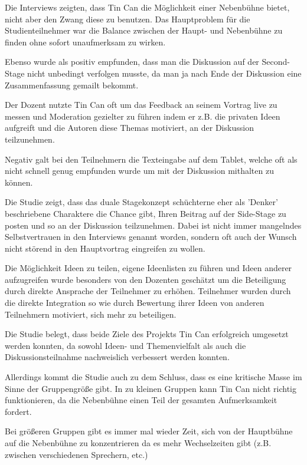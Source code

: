 Die Interviews zeigten, dass Tin Can die Möglichkeit einer Nebenbühne bietet,
nicht aber den Zwang diese zu benutzen. Das Hauptproblem für die
Studienteilnehmer war die Balance zwischen der Haupt- und Nebenbühne zu finden
ohne sofort unaufmerksam zu wirken.

Ebenso wurde als positiv empfunden, dass man die Diskussion auf der Second-Stage
nicht unbedingt verfolgen musste, da man ja nach Ende der Diskussion eine
Zusammenfassung gemailt bekommt.

Der Dozent nutzte Tin Can oft um das Feedback an seinem Vortrag live zu messen
und Moderation gezielter zu führen indem er z.B. die privaten Ideen aufgreift
und die Autoren diese Themas motiviert, an der Diskussion teilzunehmen.

Negativ galt bei den Teilnehmern die Texteingabe auf dem Tablet, welche oft als
nicht schnell genug empfunden wurde um mit der Diskussion mithalten zu können.

Die Studie\cite{HarGorSch2012} zeigt, dass das duale Stagekonzept schüchterne eher als 'Denker'
beschriebene Charaktere die Chance gibt, Ihren Beitrag auf der Side-Stage zu
posten und so an der Diskussion teilzunehmen. Dabei ist nicht immer mangelndes
Selbstvertrauen in den Interviews genannt worden, sondern oft auch der Wunsch
nicht störend in den Hauptvortrag eingreifen zu wollen.

Die Möglichkeit Ideen zu teilen, eigene Ideenlisten zu führen und Ideen anderer
aufzugreifen wurde besonders von den Dozenten geschätzt um die Beteiligung durch
direkte Ansprache der Teilnehmer zu erhöhen. Teilnehmer wurden durch die direkte
Integration so wie durch Bewertung ihrer Ideen von anderen Teilnehmern
motiviert, sich mehr zu beteiligen.

Die Studie\cite{HarGorSch2012} belegt, dass beide Ziele des Projekts Tin Can erfolgreich umgesetzt
werden konnten, da sowohl Ideen- und Themenvielfalt als auch die
Diskussionsteilnahme nachweislich verbessert werden konnten.

Allerdings kommt die Studie\cite{HarGorSch2012} auch zu dem Schluss, dass es eine kritische Masse im
Sinne der Gruppengröße gibt. In zu kleinen Gruppen kann Tin Can nicht richtig
funktionieren, da die Nebenbühne einen Teil der gesamten Aufmerksamkeit fordert.

Bei größeren Gruppen gibt es immer mal wieder Zeit, sich von der Hauptbühne auf
die Nebenbühne zu konzentrieren da es mehr Wechselzeiten gibt (z.B. zwischen
verschiedenen Sprechern, etc.)





